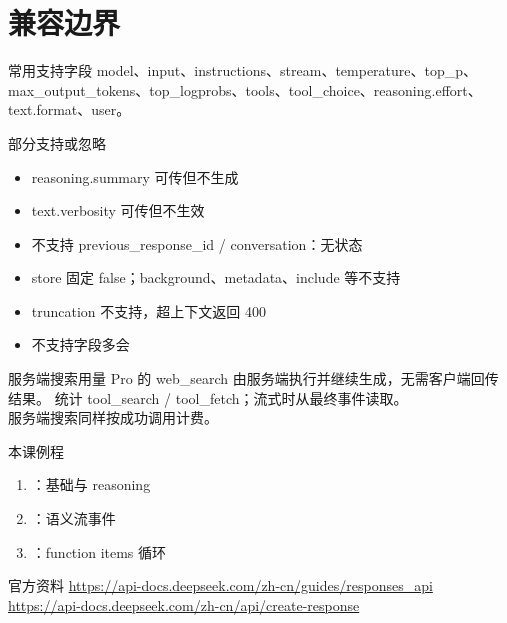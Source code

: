 \documentclass[aspectratio=169,UTF8]{ctexbeamer}
\begin{document}
\section{兼容边界}
\begin{frame}{常用支持字段}
model、input、instructions、stream、temperature、top\_p、max\_output\_tokens、top\_logprobs、tools、tool\_choice、reasoning.effort、text.format、user。
\end{frame}
\begin{frame}{部分支持或忽略}
\begin{itemize}
  \item reasoning.summary 可传但不生成
  \item text.verbosity 可传但不生效
  \item 不支持 previous\_response\_id / conversation：无状态
  \item store 固定 false；background、metadata、include 等不支持
  \item truncation 不支持，超上下文返回 400
  \item 不支持字段多会
\end{itemize}
\end{frame}
\begin{frame}{服务端搜索用量}
Pro 的 web\_search 由服务端执行并继续生成，无需客户端回传结果。 统计 tool\_search / tool\_fetch；流式时从最终事件读取。\\[8pt]
服务端搜索同样按成功调用计费。
\end{frame}
\begin{frame}{本课例程}
\begin{enumerate}
  \item {}：基础与 reasoning
  \item {}：语义流事件
  \item {}：function items 循环
\end{enumerate}
\end{frame}
\begin{frame}{官方资料}
\small
\url{https://api-docs.deepseek.com/zh-cn/guides/responses_api}\\
\url{https://api-docs.deepseek.com/zh-cn/api/create-response}
\end{frame}
\end{document}
